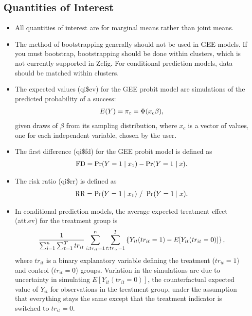 \documentclass[letterpaper,10pt,english]{sphinxmanual}
\begin{document}
\subsection{Quantities of Interest}
\label{vignette:id138}\begin{itemize}
\item {} 
All quantities of interest are for marginal means rather than joint
means.

\item {} 
The method of bootstrapping generally should not be used in GEE
models. If you must bootstrap, bootstrapping should be done within
clusters, which is not currently supported in Zelig. For conditional
prediction models, data should be matched within clusters.

\item {} 
The expected values (qi\$ev) for the GEE probit model are simulations
of the predicted probability of a success:
\begin{gather}
\begin{split}E(Y) =
  \pi_{c}= \Phi(x_{c} \beta),\end{split}\notag
\end{gather}
given draws of \(\beta\) from its sampling distribution, where
\(x_{c}\) is a vector of values, one for each independent
variable, chosen by the user.

\item {} 
The first difference (qi\$fd) for the GEE probit model is defined as
\begin{gather}
\begin{split}\textrm{FD} = \Pr(Y = 1 \mid x_1) - \Pr(Y = 1 \mid x).\end{split}\notag
\end{gather}
\item {} 
The risk ratio (qi\$rr) is defined as
\begin{gather}
\begin{split}\textrm{RR} = \Pr(Y = 1 \mid x_1) \ / \ \Pr(Y = 1 \mid x).\end{split}\notag
\end{gather}
\item {} 
In conditional prediction models, the average expected treatment
effect (att.ev) for the treatment group is
\begin{gather}
\begin{split}\frac{1}{\sum_{i=1}^n \sum_{t=1}^T tr_{it}}\sum_{i:tr_{it}=1}^n \sum_{t:tr_{it}=1}^T \left\{ Y_{it}(tr_{it}=1) -
      E[Y_{it}(tr_{it}=0)] \right\},\end{split}\notag
\end{gather}
where \(tr_{it}\) is a binary explanatory variable defining the
treatment (\(tr_{it}=1\)) and control (\(tr_{it}=0\)) groups.
Variation in the simulations are due to uncertainty in simulating
\(E[Y_{it}(tr_{it}=0)]\), the counterfactual expected value of
\(Y_{it}\) for observations in the treatment group, under the
assumption that everything stays the same except that the treatment
indicator is switched to \(tr_{it}=0\).

\end{itemize}
\end{document}
